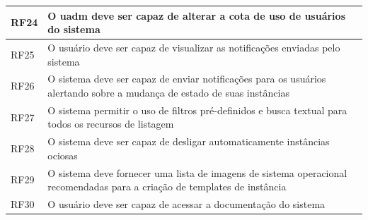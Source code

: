 \begin{longtable}{@{\extracolsep{\fill}}l p{}}
RF24 & O \gls{uadm} deve ser capaz de alterar a cota de uso de usuários do sistema \\ \hline

RF25 & O usuário deve ser capaz de visualizar as notificações enviadas pelo sistema \\ \hline

RF26 & O sistema deve ser capaz de enviar notificações para os usuários alertando sobre a mudança de estado de suas instâncias \\ \hline

RF27 & O sistema permitir o uso de filtros pré-definidos e busca textual para todos os recursos de listagem \\ 

RF28 & O sistema deve ser capaz de desligar automaticamente instâncias ociosas \\ \hline

RF29 & O sistema deve fornecer uma lista de imagens de sistema operacional recomendadas para a criação de templates de instância \\ \hline

RF30 & O usuário deve ser capaz de acessar a documentação do sistema \\ \hline

\end{longtable}

